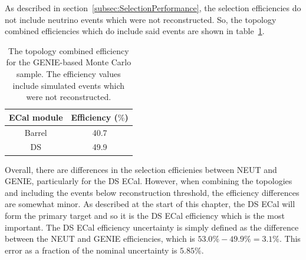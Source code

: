 As described in section~\ref{subsec:SelectionPerformance}, the selection efficiencies do not include neutrino events which were not reconstructed.  So, the topology combined efficiencies which do include said events are shown in table~\ref{table:FinalEffGENIE}.
\begin{table}
  \begin{tabular}{ c c }
    ECal module & Efficiency ($\%$) \\ \hline \hline
    Barrel & 40.7 \\
    DS & 49.9  \\
  \end{tabular}
  \caption{The topology combined efficiency for the GENIE-based Monte Carlo sample.  The efficiency values include simulated events which were not reconstructed.}
  \label{table:FinalEffGENIE}
\end{table}
Overall, there are differences in the selection efficienies between NEUT and GENIE, particularly for the DS ECal.  However, when combining the topologies and including the events below reconstruction threshold, the efficiency differences are somewhat minor.  As described at the start of this chapter, the DS ECal will form the primary target and so it is the DS ECal efficiency which is the most important.  The DS ECal efficiency uncertainty is simply defined as the difference between the NEUT and GENIE efficiencies, which is $53.0\% - 49.9\% = 3.1\%$.  This error as a fraction of the nominal uncertainty is $5.85\%$.
